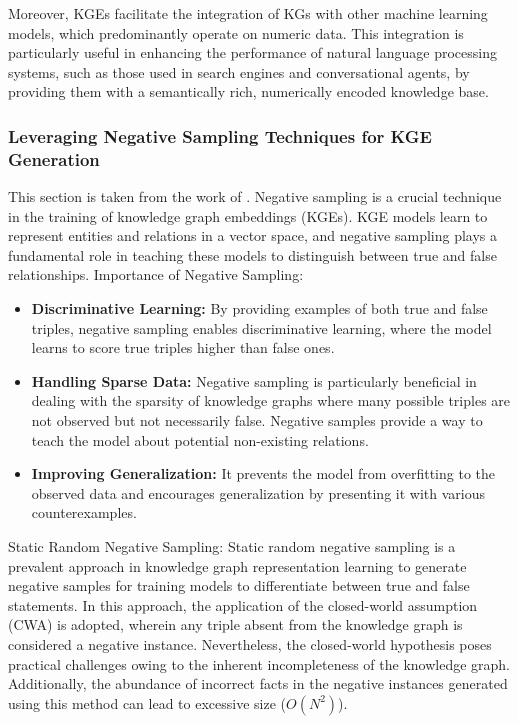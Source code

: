 \documentclass{article}
\begin{document}
Moreover, KGEs facilitate the integration of KGs with other machine learning models, which predominantly operate on numeric data. This integration is particularly useful in enhancing the performance of natural language processing systems, such as those used in search engines and conversational agents, by providing them with a semantically rich, numerically encoded knowledge base.

\subsubsection{Leveraging Negative Sampling Techniques for KGE Generation}
This section is taken from the work of \textcite{madushanka2024negative}.
Negative sampling is a crucial technique in the training of knowledge graph embeddings (KGEs). KGE models learn to represent entities and relations in a vector space, and negative sampling plays a fundamental role in teaching these models to distinguish between true and false relationships. 
Importance of Negative Sampling: 
\begin{itemize}
    \item \textbf{Discriminative Learning:} By providing examples of both true and false triples, negative sampling enables discriminative learning, where the model learns to score true triples higher than false ones.
    \item \textbf{Handling Sparse Data:} Negative sampling is particularly beneficial in dealing with the sparsity of knowledge graphs where many possible triples are not observed but not necessarily false. Negative samples provide a way to teach the model about potential non-existing relations.
    \item \textbf{Improving Generalization:} It prevents the model from overfitting to the observed data and encourages generalization by presenting it with various counterexamples.
\end{itemize}

Static Random Negative Sampling:
Static random negative sampling is a prevalent approach in knowledge graph representation learning to generate negative samples for training models to differentiate between true and false statements. In this approach, the application of the closed-world assumption (CWA) is adopted, wherein any triple absent from the knowledge graph is considered a negative instance. Nevertheless, the closed-world hypothesis poses practical challenges owing to the inherent incompleteness of the knowledge graph. Additionally, the abundance of incorrect facts in the negative instances generated using this method can lead to excessive size (\(O(N^2)\)).
\end{document}
